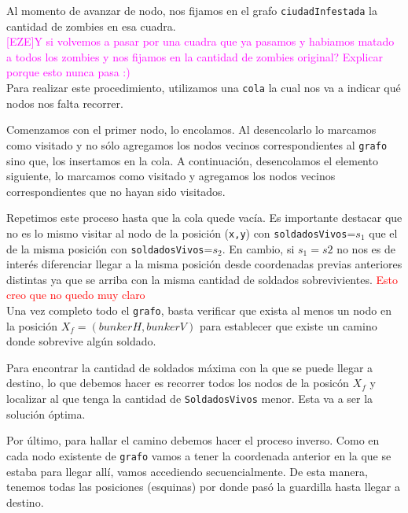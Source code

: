 Al momento de avanzar de nodo, nos fijamos en el grafo \texttt{ciudadInfestada} la cantidad de zombies en esa cuadra.\\


\textcolor{magenta}{[EZE]Y si volvemos a pasar por una cuadra que ya pasamos y habiamos matado a todos los zombies y nos fijamos en la cantidad de zombies original? Explicar porque esto nunca pasa :)}\\

Para realizar este procedimiento, utilizamos una \texttt{cola} la cual nos va a indicar qu\'e nodos nos falta recorrer.

Comenzamos con el primer nodo, lo encolamos. Al desencolarlo lo marcamos como visitado y no s\'olo agregamos los nodos vecinos correspondientes al \texttt{grafo} sino que, los insertamos en la cola. A continuaci\'on, desencolamos el elemento siguiente, lo marcamos como visitado y agregamos los nodos vecinos correspondientes que no hayan sido visitados.

Repetimos este proceso hasta que la cola quede vac\'ia. Es importante destacar que no es lo mismo visitar al nodo de la posici\'on (\texttt{x,y}) con \texttt{soldadosVivos}=$s_1$ que el de la misma posici\'on con \texttt{soldadosVivos}=$s_2$. En cambio, si $s_1=s2$ no nos es de inter\'es diferenciar llegar a la misma posici\'on desde coordenadas previas anteriores distintas ya que se arriba con la misma cantidad de soldados sobrevivientes. \textcolor{red}{Esto creo que no quedo muy claro}\\

Una vez completo todo el \texttt{grafo}, basta verificar que exista al menos un nodo en la posici\'on $X_f = (bunkerH, bunkerV)$ para establecer que existe un camino donde sobrevive alg\'un soldado.

Para encontrar la cantidad de soldados m\'axima con la que se puede llegar a destino, lo que debemos hacer es recorrer todos los nodos de la posic\'on $X_f$ y localizar al que tenga la cantidad de \texttt{SoldadosVivos} menor. Esta va a ser la soluci\'on \'optima.

Por \'ultimo, para hallar el camino debemos hacer el proceso inverso. Como en cada nodo existente de \texttt{grafo} vamos a tener la coordenada anterior en la que se estaba para llegar all\'i, vamos accediendo secuencialmente. De esta manera, tenemos todas las posiciones (esquinas) por donde pas\'o la guardilla hasta llegar a destino.\\

\bigskip


